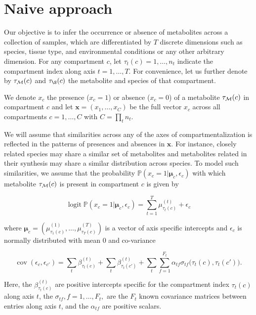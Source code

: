 \documentclass[
11pt, %
oneside, %
english, %
singlespacing, %
headsepline, %
chapterinoneline, %
]{MastersDoctoralThesis} %
\DeclareMathOperator{\logit}{logit}
\DeclareMathOperator{\cov}{cov}
\def\P{\mathbb{P}}
\def\x{\boldsymbol{x}}
\def\bmu{\boldsymbol{\mu}}
\def\M{{\cal M}}
\begin{document}
\section{Naive approach}\label{sec:methods:Naive approach}
Our objective is to infer the occurrence or absence of metabolites across a collection of samples, which are differentiated by $T$ discrete dimensions such as species, tissue type, and environmental conditions or any other arbitrary dimension. For any compartment $c$, let $\tau_t(c) = 1, \ldots, n_t$ indicate the compartment index along axis $t=1, \ldots, T$. For convenience, let us further denote by $\tau_\M(c)$ and $\tau_\S(c)$ the metabolite and species of that compartment.

We denote $x_{c}$ the presence ($x_c=1$) or absence ($x_c=0$) of a metabolite $\tau_\M(c)$ in compartment $c$ and let $\x=(x_1, \ldots, x_C)$ be the full vector $x_c$ across all compartments $c=1, \ldots, C$ with $C=\prod_t n_t$.

We will assume that similarities across any of the axes of compartmentalization is reflected in the patterns of presences and absences in $\x$. For instance, closely related species may share a similar set of metabolites and  metabolites related in their synthesis may share a similar distribution across species. To model such similarities, we assume that the probability $\P(x_c=1|\bmu_c, \epsilon_c)$ with which metabolite $\tau_\M(c)$ is present in compartment $c$ is given by

\begin{equation}\label{eq:logit of X}
	\logit \P(x_c=1|\bmu_c, \epsilon_c) = \sum_{t=1}^{T} \mu^{(t)}_{\tau_t(c)} + \epsilon_{c}
\end{equation}

where $\bmu_c=(\mu^{(1)}_{\tau_1(c)}, \ldots, \mu^{(T)}_{\tau_T(c)})$ is a vector of axis specific intercepts and $\epsilon_{c}$ is normally distributed with mean 0 and co-variance

\begin{equation}
	\cov(\epsilon_c, \epsilon_{c'}) = \sum_t \beta^{(t)}_{\tau_t(c)} + \sum_t \beta^{(t)}_{\tau_t(c')} + \sum_t \sum_{f=1}^{F_t} \alpha_{tf} \sigma_{tf}\Big(\tau_t(c), \tau_t(c')\Big).
\end{equation}

Here, the $\beta^{(t)}_{\tau_t(c)}$ are positive intercepts specific for the compartment index $\tau_t(c)$ along axis $t$, the $\sigma_{tf}, f=1, \ldots, F_t,$ are the $F_t$ known covariance matrices between entries along axis $t$, and the $\alpha_{tf}$ are positive scalars.
\end{document}
